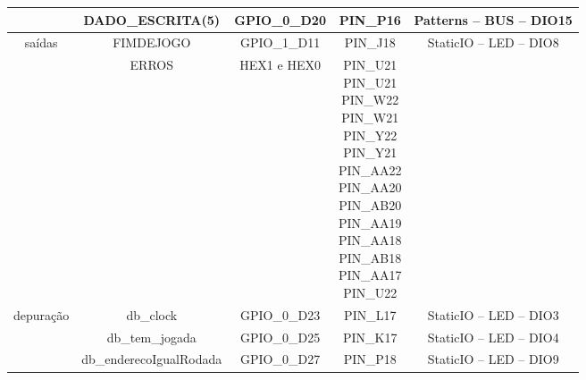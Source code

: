 \documentclass[amsmath,amssymb,floatfix]{report}
\begin{document}
\begin{table}[H]
\begin{tabular}{c|c|c|c|c|}
\multicolumn{1}{|c|}{}                           & DADO\_ESCRITA(5)        & GPIO\_0\_D20         & PIN\_P16                                                                                                                                                                              &  Patterns – BUS – DIO15 \\ \hline
\multicolumn{1}{|c|}{\multirow{2}{*}{saídas}}    & FIMDEJOGO               & GPIO\_1\_D11         & PIN\_J18                                                                                                                                                                              & StaticIO – LED – DIO8          \\ \cline{2-5} 
\multicolumn{1}{|c|}{}                           & ERROS                   & HEX1 e HEX0          & \thead{PIN\_U21 \\ PIN\_U21 \\ PIN\_W22 \\ PIN\_W21 \\ PIN\_Y22 \\ PIN\_Y21 \\ PIN\_AA22 \\ PIN\_AA20 \\ PIN\_AB20 \\ PIN\_AA19 \\ PIN\_AA18 \\ PIN\_AB18 \\ PIN\_AA17 \\ PIN\_U22}   &                                \\ \hline
\multicolumn{1}{|c|}{\multirow{8}{*}{depuração}} & db\_clock               & GPIO\_0\_D23         & PIN\_L17                                                                                                                                                                              & StaticIO – LED – DIO3          \\ \cline{2-5} 
\multicolumn{1}{|c|}{}                           & db\_tem\_jogada         & GPIO\_0\_D25         & PIN\_K17                                                                                                                                                                              & StaticIO – LED – DIO4          \\ \cline{2-5} 
\multicolumn{1}{|c|}{}                           & db\_enderecoIgualRodada & GPIO\_0\_D27         & PIN\_P18                                                                                                                                                                              & StaticIO – LED – DIO9          \\ \cline{2-5} 

\end{tabular}
\end{table}
\end{document}
